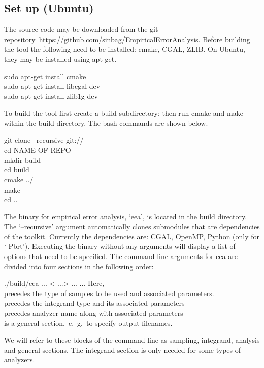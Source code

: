 \subsection{Set up (Ubuntu)}
The source code may be downloaded from the git repository~\url{https://github.com/sinbag/EmpiricalErrorAnalysis}. Before building the tool the following need
to be installed: cmake, CGAL, ZLIB. On Ubuntu, they may be installed using apt-get. 
\begin{tcolorbox}
 sudo apt-get install cmake \\
 sudo apt-get install libcgal-dev \\
 sudo apt-get install zlib1g-dev 
\end{tcolorbox}
 To build the tool first create a build subdirectory; then run cmake and make within the build directory. The bash commands are shown below. 
\begin{tcolorbox}
  git clone --recursive  git:// \\
  cd NAME OF REPO\\
  mkdir build\\
  cd build\\
  cmake ../ \\
  make\\
  cd ..
\end{tcolorbox}
The binary for empirical error analysis, `eea', is located in the build directory. The `--recursive' argument automatically clones submodules that are dependencies of the toolkit. Currently the dependencies are: CGAL, OpenMP, Python (only for  ` Pbrt'). Executing the binary without any arguments will display a list of options that need to be specified. The command line arguments for eea are divided into four sections in the following order:
\begin{tcolorbox}
 ./build/eea   ... < ...>  ...  ...
\tcblower
Here, \\
 precedes the type of samples to be used and associated parameters. \\
 precedes the integrand type and its associated parameters \\
 precedes analyzer name along with associated parameters \\
 is a general section.~e.~g.~to specify output filenames.
\end{tcolorbox}
 We will refer to these blocks of the command line as sampling, integrand, analysis and general sections. The integrand section is only needed for some types of analyzers.


